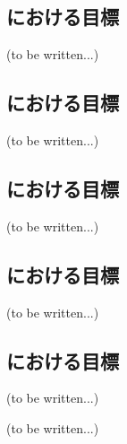 \subsection{\OutcutMilling における目標\TBW}
(to be written...)


\subsection{\KeywayMilling における目標\TBW}
(to be written...)


\subsection{\EndFaceChamferMilling における目標\TBW}
(to be written...)


\subsection{\EndFaceBoringMilling における目標\TBW}
(to be written...)


\subsection{\IncutBoringMilling における目標\TBW}
(to be written...)



\clearpage
(to be written...)
